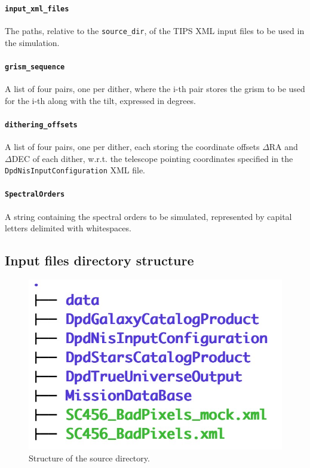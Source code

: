 \paragraph{\texttt{input\_xml\_files}} The paths, relative to the \verb+source_dir+, of the TIPS XML input files to be used in the simulation.

\paragraph{\texttt{grism\_sequence}} A list of four pairs, one per dither, where the i-th pair stores the grism to be used for the i-th along with the tilt, expressed in degrees.

\paragraph{\texttt{dithering\_offsets}} A list of four pairs, one per dither, each storing the coordinate offsets $\Delta$RA and $\Delta$DEC of each dither, w.r.t. the telescope pointing coordinates specified in the \verb+DpdNisInputConfiguration+ XML file. 

\paragraph{\texttt{SpectralOrders}} A string containing the spectral orders to be simulated, represented by capital letters delimited with whitespaces.

\subsection{Input files directory structure}\label{subsec:source_directory}

\begin{figure}
    \centering
    \includegraphics[scale=0.2]{figures/source_dir_structure.jpg}
    \caption{Structure of the source directory.}
    \label{fig:source_dir_structure}
\end{figure}

